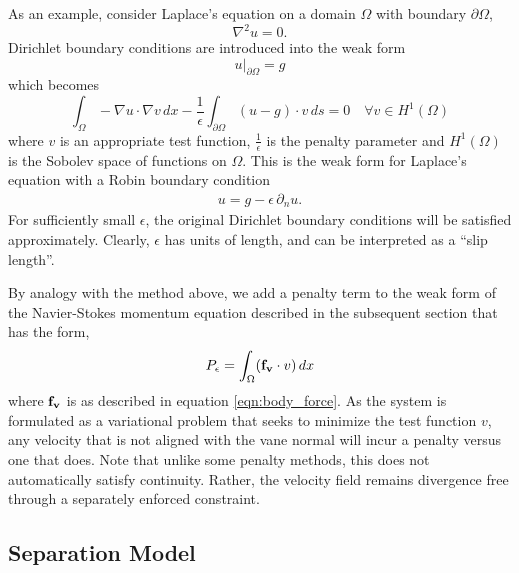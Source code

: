 As an example, consider Laplace's 
equation on a domain $\Omega$ with boundary $\partial\Omega$, 
\begin{equation}
 \nabla^2 u = 0. 
\end{equation}
Dirichlet boundary conditions are introduced into the weak form
\begin{equation}
 u|_{\partial \Omega} = g
\end{equation}
which becomes 
\begin{equation}
\int_{\Omega}  - \nabla u \cdot \nabla v \, dx - \frac{1}{\epsilon}
 \int_{\partial \Omega} (u-g) \cdot v \, ds = 0 \quad \forall v \in H^1(\Omega)
\end{equation}
where $v$ is an appropriate test function, $\frac{1}{\epsilon}$ is the
penalty parameter and $H^1(\Omega)$ is the Sobolev space of functions on
$\Omega$. This is the weak form for Laplace's equation with a Robin
boundary condition  
\begin{align}
 u = g - \epsilon \, \partial_n u. 
\end{align}
For sufficiently small $\epsilon$, the original Dirichlet boundary
conditions will be satisfied approximately. Clearly, $\epsilon$ has
units of length, and can be interpreted as a ``slip length''. 

%
%
%
%
%

By analogy with the method above, we add a penalty term to the weak
form of the Navier-Stokes momentum equation described in the subsequent
section %
that has the form, 
\begin{equation}
P_\epsilon = \int_\Omega ({\bf f_v} \cdot v) \, dx
\end{equation}
where ${\bf f_v}$ is as described in equation \ref{eqn:body_force}. 
As the system is formulated as a variational problem that seeks to
minimize the test function $v$, any velocity that is not aligned with
the vane normal will incur a penalty versus one that does. Note that unlike
some penalty methods, this does not automatically satisfy
continuity. Rather, the velocity field remains divergence free through a
separately enforced constraint.  

\subsection{Separation Model}

